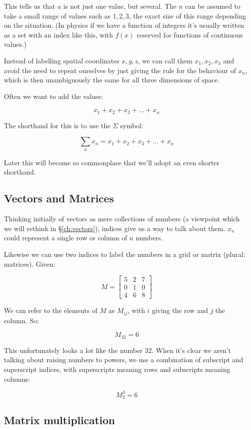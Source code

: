 This tells us that $a$ is not just one value, but several. The $n$ can be assumed to take a small range of values such as $1, 2, 3$, the exact size of this range depending on the situation. (In physics if we have a function of integers it's usually written as a set with an index like this, with $f(x)$ reserved for functions of continuous values.)

Instead of labelling spatial coordinates $x, y, z$, we can call them $x_1, x_2, x_3$ and avoid the need to repeat ourselves by just giving the rule for the behaviour of $x_n$, which is then unambiguously the same for all three dimensions of space.

Often we want to add the values:

$$x_1 + x_2 + x_3 + \dots + x_n$$

The shorthand for this is to use the $\Sigma$ symbol:

$$\sum_n{x_n} = x_1 + x_2 + x_3 + \dots + x_n$$

Later this will become so commonplace that we'll adopt an even shorter shorthand.

\subsection{Vectors and Matrices}

Thinking initially of vectors as mere collections of numbers (a viewpoint which we will rethink in §\ref{ch:vectors}), indices give us a way to talk about them. $x_n$ could represent a single row or column of $n$ numbers.

Likewise we can use two indices to label the numbers in a grid or matrix (plural: matrices). Given:

$$
M = \begin{bmatrix}
5 & 2 & 7 \\
0 & 1 & 0 \\
4 & 6 & 8
\end{bmatrix}
$$

We can refer to the elements of $M$ as $M_{ij}$, with $i$ giving the row and $j$ the column. So:

$$M_{32} = 6$$

This unfortunately looks a lot like the number $32$. When it's clear we aren't talking about raising numbers to powers, we use a combination of subscript and superscript indices, with superscripts meaning rows and subscripts meaning columns:

$$M^3_2 = 6$$

\subsection{Matrix multiplication} \label{sec:matrix-multiplication}

